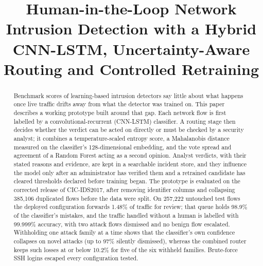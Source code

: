\documentclass[conference]{IEEEtran}
\begin{document}
\title{Human-in-the-Loop Network Intrusion Detection with a Hybrid CNN-LSTM, Uncertainty-Aware Routing and Controlled Retraining}

\author{
\and
{}
}

\maketitle

\begin{abstract}
Benchmark scores of learning-based intrusion detectors say little about what happens once live
traffic drifts away from what the detector was trained on. This paper describes a working
prototype built around that gap. Each network flow is first labelled by a convolutional-recurrent
(CNN-LSTM) classifier. A routing stage then decides whether the verdict can be acted on directly
or must be checked by a security analyst; it combines a temperature-scaled entropy score, a
Mahalanobis distance measured on the classifier's 128-dimensional embedding, and the vote spread
and agreement of a Random Forest acting as a second opinion. Analyst verdicts, with their stated
reasons and evidence, are kept in a searchable incident store, and they influence the model only
after an administrator has verified them and a retrained candidate has cleared thresholds declared
before training began. The prototype is evaluated on the corrected release of CIC-IDS2017, after
removing identifier columns and collapsing 385,106 duplicated flows before the data were split.
On 257,222 untouched test flows the deployed configuration forwards 1.48\% of traffic for review;
that queue holds 98.9\% of the classifier's mistakes, and the traffic handled without a human is
labelled with 99.999\% accuracy, with two attack flows dismissed and no benign flow escalated.
Withholding one attack family at a time shows that the classifier's own confidence collapses on
novel attacks (up to 97\% silently dismissed), whereas the combined router keeps such losses at
or below 10.2\% for five of the six withheld families. Brute-force SSH logins escaped every
configuration tested.
\end{abstract}
\end{document}

